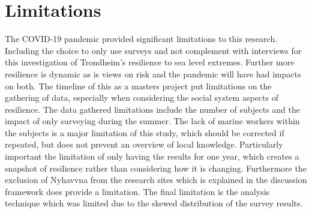 \section{Limitations}
The COVID-19 pandemic provided significant limitations to this research. Including the choice to only use surveys and not complement with interviews for this investigation of Trondheim's resilience to sea level extremes. Further more resilience is dynamic as is views on risk and the pandemic will have had impacts on both. The timeline of this as a masters project put limitations on the gathering of data, especially when considering the social system aspects of resilience. The data gathered limitations include the number of subjects and the impact of only surveying during the summer. The lack of marine workers within the subjects is a major limitation of this study, which should be corrected if repeated, but does not prevent an overview of local knowledge. Particularly important the limitation of only having the results for one year, which creates a snapshot of resilience rather than considering how it is changing. Furthermore the exclusion of Nyhavvna from the research sites which is explained in the discussion framework does provide a limitation.  The final limitation is the analysis technique which was limited due to the skewed distribution of the survey results.

